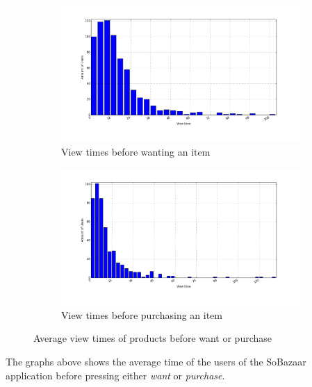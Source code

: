     \begin{figure}[H]
        \centering
        \begin{subfigure}{.5\textwidth}
            \centering
            \includegraphics[width=\dualGraphWidth]{image/product_wanteddistribution.png}
            \caption{View times before wanting an item}
    \label{figure:viewWant}
        \end{subfigure}%
        \begin{subfigure}{.5\textwidth}
            \centering
            \includegraphics[width=\dualGraphWidth]{image/product_purchase_intendeddistribution.png}
            \caption{View times before purchasing an item}
    \label{figure:viewBuy}
        \end{subfigure}
        \caption{Average view times of products before want or purchase}
    \end{figure}
        The graphs above shows the average time of the users of the SoBazaar application before pressing either \emph{want} or \emph{purchase}.

